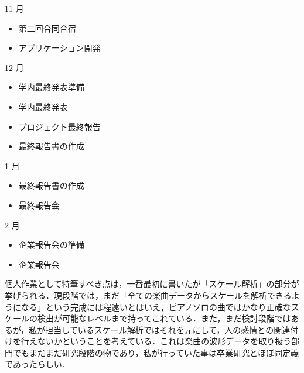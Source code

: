 11 月
\begin{itemize}
\item 第二回合同合宿
\item アプリケーション開発
\end{itemize}
12 月
\begin{itemize}
\item 学内最終発表準備
\item 学内最終発表
\item プロジェクト最終報告
\item 最終報告書の作成
\end{itemize}
1 月
\begin{itemize}
\item 最終報告書の作成
\item 最終報告会
\end{itemize}
2 月
\begin{itemize}
\item 企業報告会の準備
\item 企業報告会
\end{itemize}
個人作業として特筆すべき点は，一番最初に書いたが「スケール解析」の部分が挙げられる．現段階では，まだ「全ての楽曲データからスケールを解析できるようになる」という完成には程遠いとはいえ，ピアノソロの曲ではかなり正確なスケールの検出が可能なレベルまで持ってこれている．また，まだ検討段階ではあるが，私が担当しているスケール解析ではそれを元にして，人の感情との関連付けを行えないかということを考えている．これは楽曲の波形データを取り扱う部門でもまだまだ研究段階の物であり，私が行っていた事は卒業研究とほぼ同定義であったらしい．

